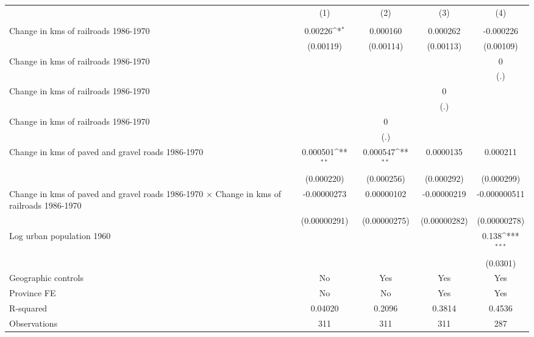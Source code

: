 {
\def\sym#1{\ifmmode^{#1}\else\(^{#1}\)\fi}
\begin{tabular}{l*{4}{c}}
\hline\hline
                &\multicolumn{1}{c}{(1)}&\multicolumn{1}{c}{(2)}&\multicolumn{1}{c}{(3)}&\multicolumn{1}{c}{(4)}\\
                &\multicolumn{1}{c}{}&\multicolumn{1}{c}{}&\multicolumn{1}{c}{}&\multicolumn{1}{c}{}\\
\hline
Change in kms of railroads 1986-1970&  0.00226\sym{*}  & 0.000160         & 0.000262         &-0.000226         \\
                &(0.00119)         &(0.00114)         &(0.00113)         &(0.00109)         \\
[1em]
Change in kms of railroads 1986-1970&                  &                  &                  &        0         \\
                &                  &                  &                  &      (.)         \\
[1em]
Change in kms of railroads 1986-1970&                  &                  &        0         &                  \\
                &                  &                  &      (.)         &                  \\
[1em]
Change in kms of railroads 1986-1970&                  &        0         &                  &                  \\
                &                  &      (.)         &                  &                  \\
[1em]
Change in kms of paved and gravel roads 1986-1970& 0.000501\sym{**} & 0.000547\sym{**} &0.0000135         & 0.000211         \\
                &(0.000220)         &(0.000256)         &(0.000292)         &(0.000299)         \\
[1em]
Change in kms of paved and gravel roads 1986-1970 $\times$ Change in kms of railroads 1986-1970&-0.00000273         &0.00000102         &-0.00000219         &-0.000000511         \\
                &(0.00000291)         &(0.00000275)         &(0.00000282)         &(0.00000278)         \\
[1em]
Log urban population 1960&                  &                  &                  &    0.138\sym{***}\\
                &                  &                  &                  & (0.0301)         \\
\hline
Geographic controls&       No         &      Yes         &      Yes         &      Yes         \\
Province FE     &       No         &       No         &      Yes         &      Yes         \\
R-squared       &  0.04020         &   0.2096         &   0.3814         &   0.4536         \\
Observations    &      311         &      311         &      311         &      287         \\
\hline\hline
\end{tabular}
}
